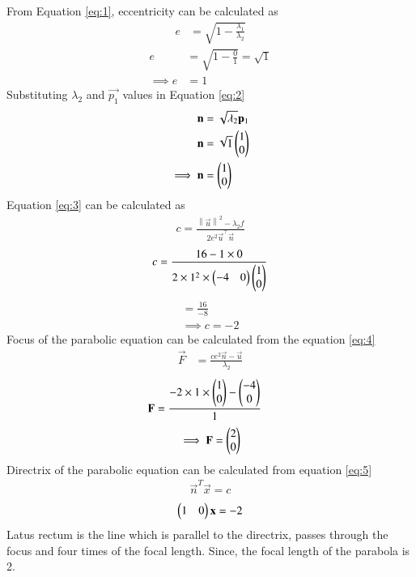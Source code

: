 \documentclass[journal,12pt,twocolumn]{IEEEtran}
\newcommand{\norm}[1]{\left\lVert#1\right\rVert}
\begin{document}
From Equation \ref{eq:1}, eccentricity can be calculated as
\begin{align}
    e&= \sqrt{1-\frac{\lambda_1}{\lambda_2}}
\end{align}
\begin{align}
    e&= \sqrt{1-\frac{0}{1}} =\sqrt{1}\\
     \implies e&= 1
\end{align}
Substituting $\lambda_2$ and $\vec{p_1}$ values in Equation {\ref{eq:2}}
\begin{align}
   \mathbf{n}&= \sqrt{\lambda_2}\mathbf{p}_1\\
   \mathbf{n}&= \sqrt{1}\begin{pmatrix}1\\0\end{pmatrix}\\
   \implies \mathbf{n}&=\begin{pmatrix}1\\0\end{pmatrix}
\end{align}
Equation \ref{eq:3} can be calculated as
\begin{align}
    c = \frac{\norm{\vec{u}}^2 - \lambda_2 f   }{2e^2\vec{u}^{\top}\vec{n}}
\end{align}
\begin{align}
    c = \frac{16-1\times0}{2 \times 1^2 \times \begin{pmatrix}-4&0\end{pmatrix}\begin{pmatrix}1\\0\end{pmatrix}}
\end{align}
\begin{align}
    =\frac{16}{-8}\\
    \implies c = -2
\end{align}
Focus of the parabolic equation can be calculated from the equation \ref{eq:4} 
 \begin{align}
  \vec{F}  &= \frac{ce^2\vec{n}-\vec{u}}{\lambda_2}
\end{align}
 \begin{align}
  \mathbf{F}  &= \frac{-2 \times 1 \times \begin{pmatrix}1\\0\end{pmatrix}-\begin{pmatrix}-4\\0\end{pmatrix}}{1}
\end{align}
\begin{align}
   \implies \mathbf{F}=\begin{pmatrix}2\\0\end{pmatrix} 
\end{align}
Directrix of the parabolic equation can be calculated from equation \ref{eq:5}
\begin{align}
   \vec{n}^T \vec{x}=c 
\end{align}
\begin{align}
    \begin{pmatrix}1&0\end{pmatrix}\mathbf{x}=-2
\end{align}
Latus rectum is the line which is parallel to the directrix, passes through the focus and four times of the focal length. Since, the focal length of the parabola is 2.\\
\end{document}
